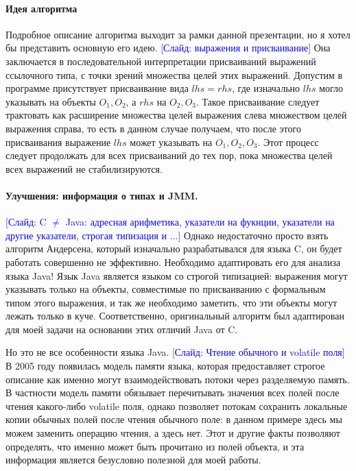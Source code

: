 \documentclass[12pt]{article}
\newcommand{\slide}[1]{\textcolor{Blue}{[Слайд: #1]}}
\newcommand{\eng}[1]{{\English#1}}
\begin{document}
  \paragraph{Идея алгоритма}
  Подробное описание алгоритма выходит за рамки данной презентации, но я хотел
  бы представить основную его идею.
  \slide{выражения и присваивание}
  Она заключается в последовательной интерпретации присваиваний выражений
  ссылочного типа, с точки зрений множества целей этих выражений. Допустим в
  программе присутствует присваивание вида $lhs = rhs$, где изначально
  $lhs$ могло указывать на объекты $O_1, O_2$, а $rhs$ на $O_2, O_3$. Такое
  присваивание следует трактовать как расширение множества целей выражения
  слева множеством целей выражения справа, то есть в данном случае получаем,
  что после этого присваивания выражение $lhs$ может указывать на $O_1, O_2,
  O_3$. Этот процесс следует продолжать для всех присваиваний до тех пор, пока
  множества целей всех выражений не стабилизируются.

  \paragraph{Улучшения: информация о типах и JMM.}
  \slide{C $\neq$ Java: адресная арифметика, указатели на фукнции, указатели на
  другие указатели, строгая типизация и ...}
  Однако недостаточно просто взять алгоритм Андерсена, который изначально
  разрабатывался для языка C, он будет работать совершенно не эффективно.
  Необходимо адаптировать его для анализа языка Java! Язык Java является языком
  со строгой типизацией: выражения могут указывать только на объекты,
  совместимые по присваиванию с формальным типом этого выражения, и так же
  необходимо заметить, что эти объекты могут лежать только в куче.
  Соответственно, оригинальный алгоритм был адаптирован для моей задачи на
  основании этих отличий Java от C.

  Но это не все особенности языка Java.
  \slide{Чтение обычного и \eng{volatile} поля}
  В 2005 году появилась модель памяти языка, которая предоставляет строгое
  описание как именно могут взаимодействовать потоки через разделяемую память.
  В частности модель памяти обязывает перечитывать значения всех полей после
  чтения какого-либо \eng{volatile} поля, однако позволяет потокам сохранить
  локальные копии обычных полей после чтения обычного поле: в данном примере
  здесь мы можем заменить операцию чтения, а здесь нет.
  Этот и другие факты позволяют определять, что именно может быть
  прочитано из полей объекта, и эта информация является безусловно полезной для
  моей работы.
\end{document}

